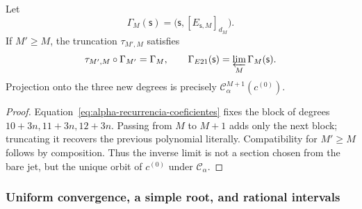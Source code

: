 \begin{proposition}
\label{prop:alpha-naturalidad-recurrencia-explicita}
Let
\[
 \Gamma_M(\mathsf s)
 =\bigl(\mathsf s,[E_{\mathsf s,M}]_{d_M}\bigr).
\]
If \(M'\geq M\), the truncation \(\tau_{M',M}\) satisfies
\begin{equation}
 \tau_{M',M}\circ\Gamma_{M'}=\Gamma_M,
 \qquad
 \Gamma_{E21}(\mathsf s)=\varprojlim_M\Gamma_M(\mathsf s).
 \label{eq:alpha-naturalidad-explicita}
\end{equation}
Projection onto the three new degrees is precisely
\(\mathcal C_\alpha^{M+1}(c^{(0)})\).
\end{proposition}

\begin{proof}
Equation~\eqref{eq:alpha-recurrencia-coeficientes} fixes the block of
degrees \(10+3n,11+3n,12+3n\). Passing from \(M\) to \(M+1\) adds only
the next block; truncating it recovers the previous polynomial literally.
Compatibility for \(M'\geq M\) follows by composition. Thus the
inverse limit is not a section chosen from the bare jet, but the unique
orbit of \(c^{(0)}\) under \(\mathcal C_\alpha\).
\end{proof}

\subsubsection{Uniform convergence, a simple root, and rational intervals}
\label{subsec:alpha-cotas-completas-rev08}

